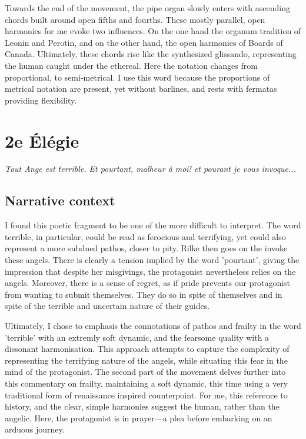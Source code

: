 \documentclass[12pt,twoside,maitrise]{dms_ks}
\theoremstyle{definition}
\begin{document}

Towards the end of the movement, the pipe organ slowly enters with ascending chords built around open fifths and fourths.
These mostly parallel, open harmonies for me evoke two influences.
On the one hand the organum tradition of Leonin and Perotin, and on the other hand, the open harmonies of Boards of Canada.
Ultimately, these chords rise like the synthesized glissando, representing the human caught under the ethereal.
Here the notation changes from proportional, to semi-metrical.
I use this word because the proportions of metrical notation are present, yet without barlines, and rests with fermatas providing flexibility.


\section{2e Élégie}

\epigraph{\textit{Tout Ange est terrible. Et pourtant, malheur à moi! et pourant je vous invoque...}}{}

\subsection{Narrative context}

I found this poetic fragment to be one of the more difficult to interpret. 
The word terrible, in particular, could be read as ferocious and terrifying, yet could also represent a more subdued pathos, closer to pity.
Rilke then goes on the invoke these angels.
There is clearly a tension implied by the word 'pourtant', giving the impression that despite her misgivings, the protagonist nevertheless relies on the angels.
Moreover, there is a sense of regret, as if pride prevents our protagonist from wanting to submit themselves.
They do so in spite of themselves and in spite of the terrible and uncertain nature of their guides.

Ultimately, I chose to emphasis the connotations of pathos and frailty in the word 'terrible' with an extremly soft dynamic, and the fearsome quality with a dissonant harmonisation.
This approach attempts to capture the complexity of representing the terrifying nature of the angels, while situating this fear in the mind of the protagonist.
The second part of the movement delves further into this commentary on frailty, maintaining a soft dynamic, this time using a very traditional form of renaissance inspired counterpoint.
For me, this reference to history, and the clear, simple harmonies suggest the human, rather than the angelic.
Here, the protagonist is in prayer---a plea before embarking on an arduous journey.
\end{document}
